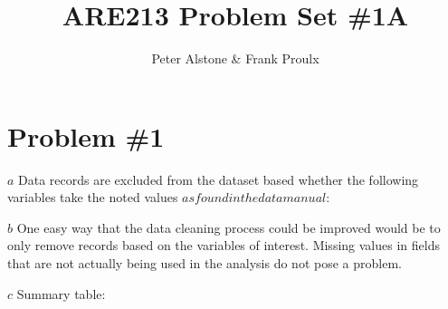 \documentclass[a4paper, 12pt]{article}
\begin{document}
\title{ARE213 Problem Set \#1A}
\author{Peter Alstone \& Frank Proulx}
\maketitle

\section{Problem \#1}
\(a\) Data records are excluded from the dataset based whether the following variables take the noted values \(as found in the data manual\):

\(b\) One easy way that the data cleaning process could be improved would be to only remove records based on the variables of interest. Missing values in fields that are not actually being used in the analysis do not pose a problem.



\(c\) Summary table:
%
\end{document}
